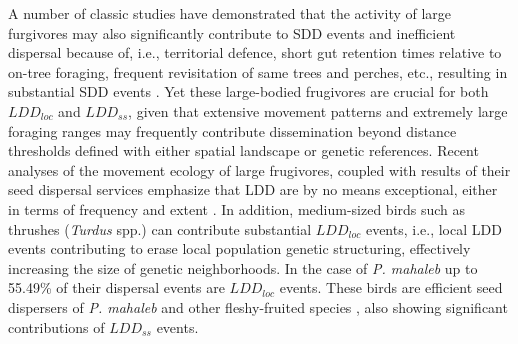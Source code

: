 \documentclass[a4paper, 12pt]{article}
\begin{document}
\begin{linenumbers}
A number of classic studies have demonstrated that the activity of large furgivores may also significantly contribute to SDD events and inefficient dispersal because of, i.e., territorial defence, short gut retention times relative to on-tree foraging, frequent revisitation of same trees and perches, etc., resulting in substantial SDD events \citep{Pratt:1983gf,Pratt:1984ly,Snow:1984ul,Snow:1988ve,Wheelwright:1991qf}. Yet these large-bodied frugivores are crucial for both $LDD_{loc}$ and $LDD_{ss}$, given that extensive movement patterns and extremely large foraging ranges may frequently contribute dissemination beyond distance thresholds defined with either spatial landscape or genetic references. Recent analyses of the movement ecology of large frugivores, coupled with results of their seed dispersal services emphasize that LDD are by no means exceptional, either in terms of frequency and extent \citep[e.g., ][]{Westcott:2005,Bueno:2013cg,Morales:2013dg,Carlo:2013vd}. In addition, medium-sized birds such as thrushes (\textit{Turdus} spp.) can contribute substantial $LDD_{loc}$ events, i.e., local LDD events contributing to erase local population genetic structuring, effectively increasing the size of genetic neighborhoods. In the case of \textit{P. mahaleb} up to 55.49\% of their dispersal events are $LDD_{loc}$ events. These birds are efficient seed dispersers of \textit{P. mahaleb} and other fleshy-fruited species \citep{Snow:1988ve,Jordano:2000ft,Carlo:2013vd}, also showing significant contributions of $LDD_{ss}$ events.


\end{linenumbers}
\end{document}
